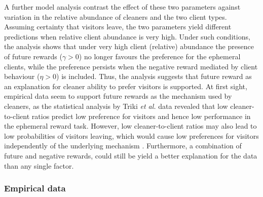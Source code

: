 \documentclass[]{rsos}%
\begin{document}
A further model analysis contrast the effect of these two
parameters against variation in the relative abundance of cleaners
and the two client types. Assuming certainty that visitors leave, the
two parameters yield different
predictions when relative client abundance is very high. Under such
conditions, the analysis shows that under very high client (relative)
abundance the presence of future rewards (\(\gamma>0\)) no longer favours
the preference for the ephemeral clients, while the preference persists
when the negative reward mediated by client behaviour (\(\eta>0\)) is
included. Thus, the analysis suggests that future reward as an
explanation for cleaner ability to prefer visitors is supported.
At first sight, empirical data seem to support future rewards as
the mechanism used by cleaners, as the statistical analysis by
Triki \emph{et al.} \citep{triki_Biological_2019} data revealed that low
cleaner-to-client ratios predict low preference for visitors and hence
low performance in the ephemeral reward task. However, low cleaner-to-client
ratios may also lead to low probabilities of visitors leaving, which would
cause low preferences for visitors independently of the underlying
mechanism \citep{quinones_Reinforcement_2019}. Furthermore, a combination
of future and negative rewards, could still be yield a better explanation
for the data than any single factor.

\hypertarget{empirical-data}{%
\subsubsection{Empirical data}\label{empirical-data}}
\end{document}
